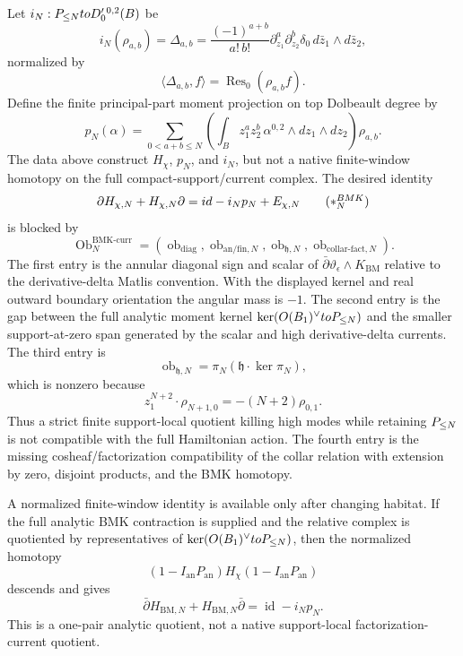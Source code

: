 \begin{thm}
  Let \(i_N:P_{\leq N}toD'_0{}^{0,2}(B)\) be
  \[
    i_N(\rho_{a,b})=\Delta_{a,b}
      =
      \frac{(-1)^{a+b}}{a!\,b!}
      \partial_{z_1}^a\partial_{z_2}^b
      \delta_0\,d\bar z_1\wedge d\bar z_2,
  \]
  normalized by
  \[
    \langle\Delta_{a,b},f\rangle
      =
      \operatorname{Res}_0(\rho_{a,b}f).
  \]
  Define the finite principal-part moment projection on top Dolbeault
  degree by
  \[
    p_N(\alpha)
      =
      \sum_{0<a+b\leq N}
      \left(
        \int_B z_1^az_2^b\,
        \alpha^{0,2}\wedge dz_1\wedge dz_2
      \right)\rho_{a,b}.
  \]
  The data above construct \(H_\chi\), \(p_N\), and \(i_N\), but not a
  native finite-window homotopy on the full compact-support/current
  complex.  The desired identity
  \[
    \bar\partial H_{\chi,N}
    +H_{\chi,N}\bar\partial
    =
    \operatorname{id}-i_Np_N+E_{\chi,N}
  \tag{\(\ast_N^{\mathrm{BMK}}\)}
  \]
  is blocked by
  \[
    \operatorname{Ob}^{\mathrm{BMK\mbox{-}curr}}_N
    =
    \left(
      \operatorname{ob}_{\mathrm{diag}},
      \operatorname{ob}_{\mathrm{an}/\mathrm{fin},N},
      \operatorname{ob}_{\mathfrak h,N},
      \operatorname{ob}_{\mathrm{collar\mbox{-}fact},N}
    \right).
  \]
  The first entry is the annular diagonal sign and scalar of
  \(\bar\partial\vartheta_\epsilon\wedge K_{\mathrm{BM}}\) relative to
  the derivative-delta Matlis convention.  With the displayed kernel and
  real outward boundary orientation the angular mass is \(-1\).  The
  second entry is the gap between the full analytic moment kernel
  \(\ker(O(B_1)^\vee toP_{\le N})\) and the smaller
  support-at-zero span generated by the scalar and high derivative-delta
  currents.  The third entry is
  \[
    \operatorname{ob}_{\mathfrak h,N}
      =
    \pi_N(\mathfrak h\cdot\ker\pi_N),
  \]
  which is nonzero because
  \[
    z_1^{N+2}\cdot\rho_{N+1,0}=-(N+2)\rho_{0,1}.
  \]
  Thus a strict finite support-local quotient killing high modes while
  retaining \(P_{\le N}\) is not compatible with the full Hamiltonian
  action.  The fourth entry is the missing cosheaf/factorization
  compatibility of the collar relation with extension by zero, disjoint
  products, and the BMK homotopy.

  A normalized finite-window identity is available only after changing
  habitat.  If the full analytic BMK contraction is supplied and the
  relative complex is quotiented by representatives of
  \(\ker(O(B_1)^\vee toP_{\le N})\), then the normalized
  homotopy
  \[
    (1-I_{\mathrm{an}}P_{\mathrm{an}})H_\chi
    (1-I_{\mathrm{an}}P_{\mathrm{an}})
  \]
  descends and gives
  \[
    \bar\partial H_{\mathrm{BM},N}
    +H_{\mathrm{BM},N}\bar\partial
    =
    \operatorname{id}-i_Np_N .
  \]
  This is a one-pair analytic quotient, not a native support-local
  factorization-current quotient.


\end{thm}
